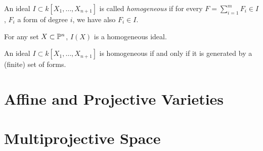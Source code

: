 \begin{definition}
	An ideal $I \subset k[X_{1},\ldots,X_{n+1}]$ is called \textit{homogeneous} if for every $F = \sum_{i=1}^{m} F_{i} \in I$, $F_{i}$ a form of degree $i$, we have also $F_{i} \in I$. 
\end{definition}

\begin{remark}
	For any set $X \subset \mathbb{P}^{n}$, $I(X)$ is a homogeneous ideal.
\end{remark}

\begin{prop}
	An ideal $I \subset k[X_{1},\ldots,X_{n+1}]$ is homogeneous if and only if it is generated by a (finite) set of forms.
\end{prop}

\section{Affine and Projective Varieties}



\section{Multiprojective Space}
